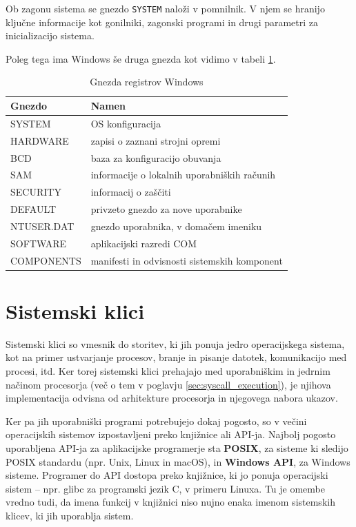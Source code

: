 \documentclass[a4paper,12pt,openright]{book}
\begin{document}
Ob zagonu sistema se gnezdo \texttt{SYSTEM} naloži v pomnilnik.
V njem se hranijo ključne informacije kot gonilniki, zagonski programi in drugi parametri za inicializacijo sistema.

Poleg tega ima Windows še druga gnezda kot vidimo v tabeli \ref{tab:windows_registry_hives}.

\begin{table}[h!]
	\begin{center}
		\begin{tabular}{ p{3.7cm}|p{8.8cm} }
			Gnezdo     & Namen                                         \\
			\hline
			SYSTEM     & OS konfiguracija                              \\
			HARDWARE   & zapisi o zaznani strojni opremi               \\
			BCD        & baza za konfiguracijo obuvanja                \\
			SAM        & informacije o lokalnih uporabniških računih \\
			SECURITY   & informacij o zaščiti                        \\
			DEFAULT    & privzeto gnezdo za nove uporabnike            \\
			NTUSER.DAT & gnezdo uporabnika, v domačem imeniku         \\
			SOFTWARE   & aplikacijski razredi COM                      \\
			COMPONENTS & manifesti in odvisnosti sistemskih komponent  \\
		\end{tabular}
	\end{center}
	\caption{Gnezda registrov Windows \cite{Tanenbaum_Bos_2023}}
	\label{tab:windows_registry_hives}
\end{table}

\section{Sistemski klici} \label{sec:syscalls}

Sistemski klici so vmesnik do storitev, ki jih ponuja jedro operacijskega sistema, kot na primer ustvarjanje procesov, branje in pisanje datotek, komunikacijo med procesi, itd.
Ker torej sistemski klici prehajajo med uporabniškim in jedrnim načinom procesorja (več o tem v poglavju \ref{sec:syscall_execution}), je njihova implementacija odvisna od arhitekture procesorja in njegovega nabora ukazov.

Ker pa jih uporabniški programi potrebujejo dokaj pogosto, so v večini operacijskih sistemov izpostavljeni preko knjižnice ali API-ja.
Najbolj pogosto uporabljena API-ja za aplikacijske programerje sta \textbf{POSIX}, za sisteme ki sledijo POSIX standardu (npr. Unix, Linux in macOS), in \textbf{Windows API}, za Windows sisteme.
Programer do API dostopa preko knjižnice, ki jo ponuja operacijski sistem -- npr. glibc za programski jezik C, v primeru Linuxa.
Tu je omembe vredno tudi, da imena funkcij v knjižnici niso nujno enaka imenom sistemskih klicev, ki jih uporablja sistem.
\end{document}
